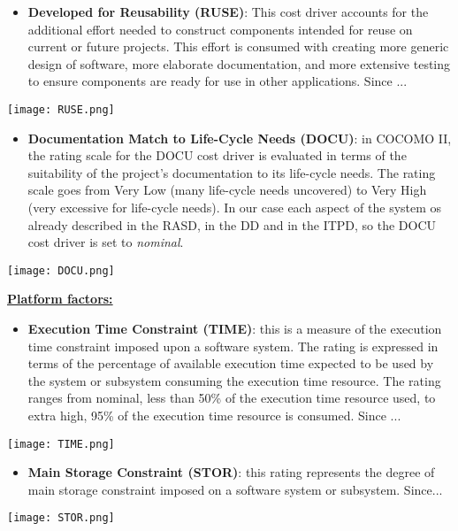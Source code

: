 \begin{itemize}
	\item \textbf{Developed for Reusability (RUSE)}: This cost driver accounts for the additional effort needed to construct components intended for reuse on current or future projects. This effort is consumed with creating more generic design of software, more elaborate documentation, and more extensive testing to ensure components are ready for use in other applications. Since ... \todo{}
\end{itemize}
\begin{center}
	\texttt{[image: RUSE.png]}
\end{center}

\begin{itemize}
	\item \textbf{Documentation Match to Life-Cycle Needs (DOCU)}: in COCOMO II, the rating scale for the DOCU cost driver is evaluated in terms of the suitability of the project’s documentation to its life-cycle needs. The rating scale goes from Very Low (many life-cycle needs uncovered) to Very High (very excessive for life-cycle needs). In our case each aspect of the system os already described in the RASD, in the DD and in the ITPD, so the DOCU cost driver is set to \textit{nominal}.
\end{itemize}
\begin{center}
	\texttt{[image: DOCU.png]}
\end{center}

\textbf{\underline{Platform factors:}}

\begin{itemize}
	\item \textbf{Execution Time Constraint (TIME)}: this is a measure of the execution time constraint imposed upon a software system. The	rating is expressed in terms of the percentage of available execution time expected to be used by	the system or subsystem consuming the execution time resource. The rating ranges from	nominal, less than 50\% of the execution time resource used, to extra high, 95\% of the execution time resource is consumed. Since ... \todo{}
\end{itemize}
\begin{center}
	\texttt{[image: TIME.png]}
\end{center}	

\begin{itemize}
	\item \textbf{Main Storage Constraint (STOR)}: this rating represents the degree of main storage constraint imposed on a software system or subsystem. Since... \todo{}
\end{itemize}
\begin{center}
	\texttt{[image: STOR.png]}
\end{center}

